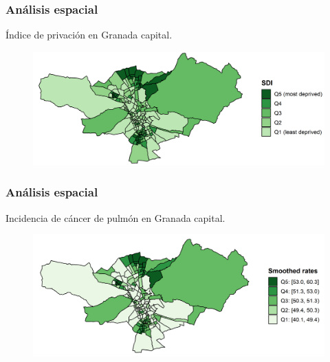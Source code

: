 \documentclass{beamer}
\begin{document}

\begin{frame}\frametitle{Análisis espacial}
	\centering Índice de privación en Granada capital.
	\begin{figure}
		\centering
		\includegraphics[width=.9\textwidth]{images/maps_DI_zoom.png}
	\end{figure}
\end{frame}


\begin{frame}\frametitle{Análisis espacial}

	\centering Incidencia de cáncer de pulmón en Granada capital.
	\begin{figure}
		\centering
		\includegraphics[width=.9\textwidth]{images/03_lung_ebs_zoom.png}
	\end{figure}
\end{frame}

\end{document}

